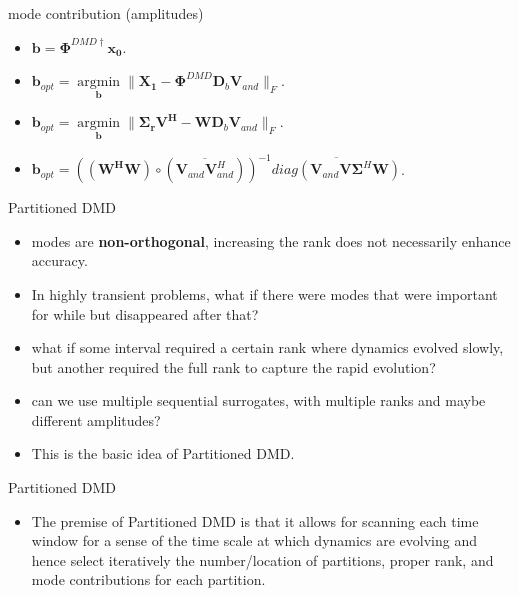 \documentclass[fleqn]{beamer}
\DeclareMathOperator*{\argmin}{argmin}
\renewcommand{\vec}[1]{\bm{#1}} %
\begin{document}
\begin{frame}
\begin{block}{mode contribution (amplitudes)}
\begin{itemize}
\item$\vec{b}=\boldsymbol{\Phi}^{DMD\dagger}\vec{x_0}.$
\item $\vec{b}_{opt}=\argmin\limits_{\vec{b}}\|\mathbf{X_{1}} -\boldsymbol{\Phi}^{DMD}\mathbf{D}_b\mathbf{V}_{and}\|_F $.
\item$\vec{b}_{opt}=\argmin\limits_{\vec{b}}\|\boldsymbol{\Sigma_r}\mathbf{V^{H}} -\mathbf{W}\mathbf{D}_b\mathbf{V}_{and}\|_F.$
\item $\vec{b}_{opt}=\left( (\mathbf{W^H}\mathbf{W})\circ( \overline{\mathbf{V}_{and}\mathbf{V}_{and}^{H}})\right)^{-1}\overline{diag(\mathbf{V}_{and}\mathbf{V}\boldsymbol{\Sigma}^{H}\mathbf{W})}$.
\end{itemize}
\end{block}
\end{frame}

\begin{frame}
\begin{block}{Partitioned DMD}
\begin{itemize}
\item modes are \textbf{non-orthogonal}, increasing the rank does not necessarily enhance accuracy. 
\item In highly transient problems, what if there were modes that were important for while but disappeared after that?
\item what if some interval required a certain rank where dynamics evolved slowly, but another required the full rank to capture the rapid evolution?
\item can we use multiple sequential surrogates, with multiple ranks and maybe different amplitudes?
\item This is the basic idea of Partitioned DMD.
\end{itemize}
\end{block}
\end{frame}

\begin{frame}
\begin{block}{Partitioned DMD}
\begin{itemize}
\item  The premise of Partitioned DMD is that it allows for scanning each time window for a sense of the time scale at which dynamics are evolving and hence select iteratively the number/location of partitions, proper rank, and mode contributions for each partition.  
\end{itemize}
\end{block}
\end{frame}
\end{document}
